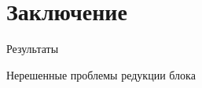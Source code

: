 \section{Заключение}
\label{sec:Chapter5} 

Результаты\\
\par Нерешенные проблемы редукции блока\\


\newpage
